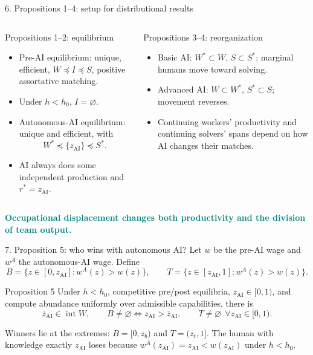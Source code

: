 \documentclass[aspectratio=169,11pt]{beamer}
\newcommand{\zAI}{z_{\mathrm{AI}}}
\newcommand{\zbAI}{\bar z_{\mathrm{AI}}}
\newcommand{\wA}{w^{A}}
\newcommand{\key}[1]{\textcolor{teal}{\textbf{#1}}}
\begin{document}
\begin{frame}{6. Propositions 1--4: setup for distributional results}
  \begin{columns}[T,onlytextwidth]
      \begin{block}{Propositions 1--2: equilibrium}
      \small
      \begin{itemize}
        \item Pre-AI equilibrium: unique, efficient, $W\preceq I\preceq S$, positive assortative matching.
        \item Under $h<h_0$, $I=\varnothing$.
        \item Autonomous-AI equilibrium: unique and efficient, with
          \[
          W^*\preceq\{\zAI\}\preceq S^*.
          \]
        \item AI always does some independent production and $r^*=\zAI$.
      \end{itemize}
      \end{block}
      \begin{block}{Propositions 3--4: reorganization}
      \small
      \begin{itemize}
        \item Basic AI: $W^*\subset W$, $S\subset S^*$; marginal humans move toward solving.
        \item Advanced AI: $W\subset W^*$, $S^*\subset S$; movement reverses.
        \item Continuing workers' productivity and continuing solvers' spans depend on how AI changes their matches.
      \end{itemize}
      \end{block}
  \end{columns}
  \centering
  \key{Occupational displacement changes both productivity and the division of team output.}
\end{frame}

\begin{frame}{7. Proposition 5: who wins with autonomous AI?}
  Let $w$ be the pre-AI wage and $\wA$ the autonomous-AI wage. Define
  \[
    B=\{z\in[0,\zAI]:\wA(z)>w(z)\},\qquad
    T=\{z\in[\zAI,1]:\wA(z)>w(z)\}.
  \]

  \begin{block}{Proposition 5}
    Under $h<h_0$, competitive pre/post equilibria, $\zAI\in[0,1)$, and compute abundance uniformly over admissible capabilities, there is
    \[
      \boxed{\zbAI\in\operatorname{int}W},\qquad
      \boxed{B\ne\varnothing\iff \zAI>\zbAI},\qquad
      \boxed{T\ne\varnothing\ \ \forall\zAI\in[0,1)}.
    \]
  \end{block}

  \small
  Winners lie at the extremes: $B=[0,z_b)$ and $T=(z_t,1]$. The human with knowledge exactly $\zAI$ loses because $\wA(\zAI)=\zAI<w(\zAI)$ under $h<h_0$.
\end{frame}
\end{document}
